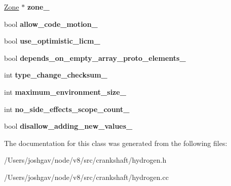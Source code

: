\begin{DoxyCompactItemize}
\item 
\hyperlink{classv8_1_1internal_1_1_zone}{Zone} $\ast$ {\bfseries zone\+\_\+}\hypertarget{classv8_1_1internal_1_1_h_graph_a701a9cd311b8f328b6be6b1d5ff0ba9c}{}\label{classv8_1_1internal_1_1_h_graph_a701a9cd311b8f328b6be6b1d5ff0ba9c}

\item 
bool {\bfseries allow\+\_\+code\+\_\+motion\+\_\+}\hypertarget{classv8_1_1internal_1_1_h_graph_a23b3415f11057c510134bbdf885a0b4b}{}\label{classv8_1_1internal_1_1_h_graph_a23b3415f11057c510134bbdf885a0b4b}

\item 
bool {\bfseries use\+\_\+optimistic\+\_\+licm\+\_\+}\hypertarget{classv8_1_1internal_1_1_h_graph_a17dfb0ea178eb9f126a6022b214f0c7c}{}\label{classv8_1_1internal_1_1_h_graph_a17dfb0ea178eb9f126a6022b214f0c7c}

\item 
bool {\bfseries depends\+\_\+on\+\_\+empty\+\_\+array\+\_\+proto\+\_\+elements\+\_\+}\hypertarget{classv8_1_1internal_1_1_h_graph_aecd25692242b5270b07822a97c58c614}{}\label{classv8_1_1internal_1_1_h_graph_aecd25692242b5270b07822a97c58c614}

\item 
int {\bfseries type\+\_\+change\+\_\+checksum\+\_\+}\hypertarget{classv8_1_1internal_1_1_h_graph_a7af2a4a694575822362f4115aad181cc}{}\label{classv8_1_1internal_1_1_h_graph_a7af2a4a694575822362f4115aad181cc}

\item 
int {\bfseries maximum\+\_\+environment\+\_\+size\+\_\+}\hypertarget{classv8_1_1internal_1_1_h_graph_abd6bbd0f2fca9a79687434d725079b4e}{}\label{classv8_1_1internal_1_1_h_graph_abd6bbd0f2fca9a79687434d725079b4e}

\item 
int {\bfseries no\+\_\+side\+\_\+effects\+\_\+scope\+\_\+count\+\_\+}\hypertarget{classv8_1_1internal_1_1_h_graph_a56f8958052718d88f5a3e3478002f2a3}{}\label{classv8_1_1internal_1_1_h_graph_a56f8958052718d88f5a3e3478002f2a3}

\item 
bool {\bfseries disallow\+\_\+adding\+\_\+new\+\_\+values\+\_\+}\hypertarget{classv8_1_1internal_1_1_h_graph_a737c08149394ff8d45cbaca6bd5ae7bd}{}\label{classv8_1_1internal_1_1_h_graph_a737c08149394ff8d45cbaca6bd5ae7bd}

\end{DoxyCompactItemize}


The documentation for this class was generated from the following files\+:\begin{DoxyCompactItemize}
\item 
/\+Users/joshgav/node/v8/src/crankshaft/hydrogen.\+h\item 
/\+Users/joshgav/node/v8/src/crankshaft/hydrogen.\+cc\end{DoxyCompactItemize}
